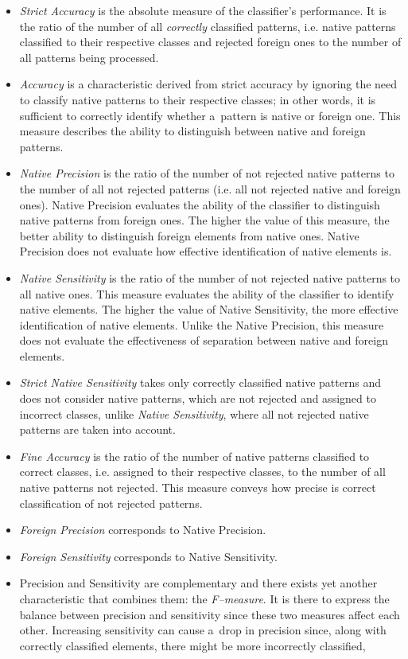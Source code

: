 \documentclass{llncs}
\begin{document}
\begin{itemize}
  \item \emph{Strict Accuracy} is the absolute measure of the classifier's performance. It is the ratio of the number of all \emph{correctly} classified patterns, i.e. native patterns classified to their respective classes and rejected foreign ones to the number of all patterns being processed.
  \item \emph{Accuracy} is a characteristic derived from strict accuracy by ignoring the need to classify native patterns to their respective classes; in other words, it is sufficient to correctly identify whether a~pattern is native or foreign one. This measure describes the ability to distinguish between native and foreign patterns.
  \item \emph{Native Precision} is the ratio of the number of not rejected native patterns to the number of all not rejected patterns (i.e. all not rejected native and foreign ones). Native Precision evaluates the ability of the classifier to distinguish native patterns from foreign ones. The higher the value of this measure, the better ability to distinguish foreign elements from native ones. Native Precision does not evaluate how effective identification of native elements is.
  \item \emph{Native Sensitivity} is the ratio of the number of not rejected native patterns to all native ones. This measure evaluates the ability of the classifier to identify native elements. The higher the value of Native Sensitivity, the more effective identification of native elements. Unlike the Native Precision, this measure does not evaluate the effectiveness of separation between native and foreign elements.
  \item \emph{Strict Native Sensitivity} takes only correctly classified native patterns and does not consider native patterns, which are not rejected and assigned to incorrect classes, unlike \emph{Native Sensitivity}, where all not rejected native patterns are taken into account.
  \item \emph{Fine Accuracy} is the ratio of the number of native patterns classified to correct classes, i.e. assigned to their respective classes, to the number of all native patterns not rejected. This measure conveys how precise is correct classification of not rejected patterns.
  \item \emph{Foreign Precision} corresponds to Native Precision.
  \item \emph{Foreign Sensitivity} corresponds to Native Sensitivity.
  \item  Precision and Sensitivity are complementary and there exists yet another characteristic that combines them: the \textit{F--measure}. It is there to express the balance between precision and sensitivity since these two measures affect each other. Increasing sensitivity can cause a~drop in precision since, along with correctly classified elements, there might be more incorrectly classified,
\end{itemize}
\end{document}
